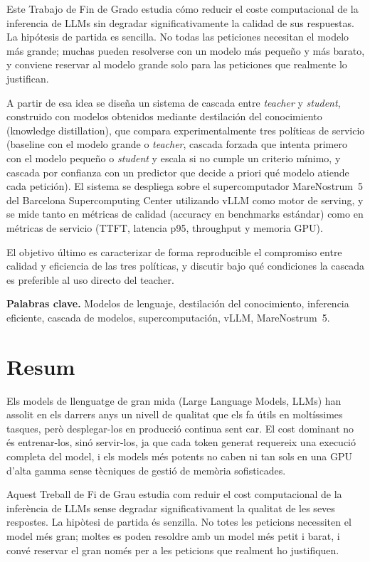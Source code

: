 \documentclass[11pt,a4paper]{article}
\begin{document}
Este Trabajo de Fin de Grado estudia cómo reducir el coste computacional de la inferencia de LLMs sin degradar significativamente la calidad de sus respuestas. La hipótesis de partida es sencilla. No todas las peticiones necesitan el modelo más grande; muchas pueden resolverse con un modelo más pequeño y más barato, y conviene reservar al modelo grande solo para las peticiones que realmente lo justifican.

A partir de esa idea se diseña un sistema de cascada entre \textit{teacher} y \textit{student}, construido con modelos obtenidos mediante destilación del conocimiento (knowledge distillation), que compara experimentalmente tres políticas de servicio (baseline con el modelo grande o \textit{teacher}, cascada forzada que intenta primero con el modelo pequeño o \textit{student} y escala si no cumple un criterio mínimo, y cascada por confianza con un predictor que decide a priori qué modelo atiende cada petición). El sistema se despliega sobre el supercomputador MareNostrum~5 del Barcelona Supercomputing Center utilizando vLLM como motor de serving, y se mide tanto en métricas de calidad (accuracy en benchmarks estándar) como en métricas de servicio (TTFT, latencia p95, throughput y memoria GPU).

El objetivo último es caracterizar de forma reproducible el compromiso entre calidad y eficiencia de las tres políticas, y discutir bajo qué condiciones la cascada es preferible al uso directo del teacher.

\textbf{Palabras clave.} Modelos de lenguaje, destilación del conocimiento, inferencia eficiente, cascada de modelos, supercomputación, vLLM, MareNostrum~5.

\newpage
\section*{Resum}

Els models de llenguatge de gran mida (Large Language Models, LLMs) han assolit en els darrers anys un nivell de qualitat que els fa útils en moltíssimes tasques, però desplegar-los en producció continua sent car. El cost dominant no és entrenar-los, sinó servir-los, ja que cada token generat requereix una execució completa del model, i els models més potents no caben ni tan sols en una GPU d'alta gamma sense tècniques de gestió de memòria sofisticades.

Aquest Treball de Fi de Grau estudia com reduir el cost computacional de la inferència de LLMs sense degradar significativament la qualitat de les seves respostes. La hipòtesi de partida és senzilla. No totes les peticions necessiten el model més gran; moltes es poden resoldre amb un model més petit i barat, i convé reservar el gran només per a les peticions que realment ho justifiquen.
\end{document}
